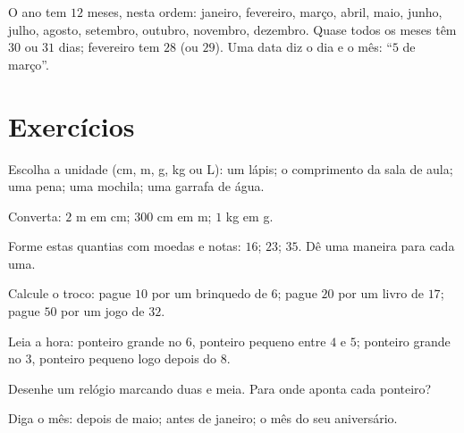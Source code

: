 \begin{example}[O calendário]\label{ex:g2:measure:calendar}
O ano tem $12$ meses, nesta ordem: janeiro, fevereiro, março, abril,
maio, junho, julho, agosto, setembro, outubro, novembro, dezembro.
Quase todos os meses têm $30$ ou $31$ dias; fevereiro tem $28$ (ou
$29$). Uma data diz o dia e o mês: ``$5$ de março''.
\end{example}

\section{Exercícios}

\begin{exercise}[$\star$]\label{exo:g2:measure:1}
Escolha a unidade (cm, m, g, kg ou L): um lápis; o comprimento da
sala de aula; uma pena; uma mochila; uma garrafa de água.
\end{exercise}

\begin{exercise}[$\star$]\label{exo:g2:measure:2}
Converta: $2$ m em cm; $300$ cm em m; $1$ kg em g.
\end{exercise}

\begin{exercise}[$\star$]\label{exo:g2:measure:3}
Forme estas quantias com moedas e notas: $16$; \quad $23$; \quad
$35$. Dê uma maneira para cada uma.
\end{exercise}

\begin{exercise}[$\star$]\label{exo:g2:measure:4}
Calcule o troco: pague $10$ por um brinquedo de $6$; pague $20$ por
um livro de $17$; pague $50$ por um jogo de $32$.
\end{exercise}

\begin{exercise}[$\star$]\label{exo:g2:measure:5}
Leia a hora: ponteiro grande no $6$, ponteiro pequeno entre $4$ e
$5$; ponteiro grande no $3$, ponteiro pequeno logo depois do $8$.
\end{exercise}

\begin{exercise}[$\star$]\label{exo:g2:measure:6}
Desenhe um relógio marcando duas e meia. Para onde aponta cada
ponteiro?
\end{exercise}

\begin{exercise}[$\star$]\label{exo:g2:measure:7}
Diga o mês: depois de maio; antes de janeiro; o mês do seu
aniversário.
\end{exercise}


